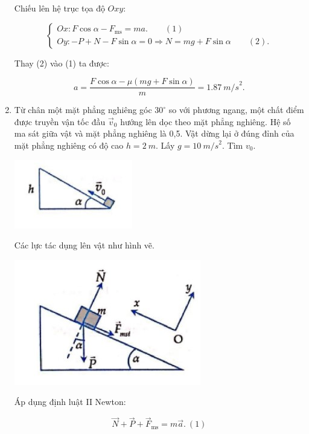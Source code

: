 \begin{enumerate}[label=\bfseries Bài \arabic*:,leftmargin=1.5cm]
{		Chiếu lên hệ trục tọa độ $Oxy$:
		
		$$\begin{cases}
			Ox: F\cos \alpha - F_\text{ms} =ma.\qquad (1) \\
			Oy: - P + N - F\sin \alpha= 0 \Rightarrow N =mg + F \sin \alpha\qquad (2).
			
		\end{cases}$$
		
		Thay (2) vào (1) ta được:
		
		$$ a = \dfrac{F \cos \alpha - \mu (mg + F\sin \alpha)}{m} = \SI{1,87}{m/s}^2. $$
		
	} 

\item {}


{
	Từ chân một mặt phẳng nghiêng góc $30^\circ$ so với phương ngang, một chất điểm được truyền vận tốc đầu $\vec v_0$ hướng lên dọc theo mặt phẳng nghiêng. Hệ số ma sát giữa vật và mặt phẳng nghiêng là 0,5. Vật dừng lại ở đúng đỉnh của mặt phẳng nghiêng có độ cao $h =\SI{2}{m}.$ Lấy $ g = \SI{10}{m/s}^2$. Tìm $v_0$.
	
	\begin{center}
		\includegraphics[scale=1]{../figs/VN10-2022-PH-TP021-9.jpg}
	\end{center}
}

\hideall
{
	
	Các lực tác dụng lên vật như hình vẽ.
	\begin{center}
		\includegraphics[scale=1]{../figs/VN10-2022-PH-TP021-10.jpg}
	\end{center}
	Áp dụng định luật II Newton:
	
	$$\vec N + \vec P + \vec F_\text{ms} = m\vec a.\ (1)$$
	
}
\end{enumerate}
